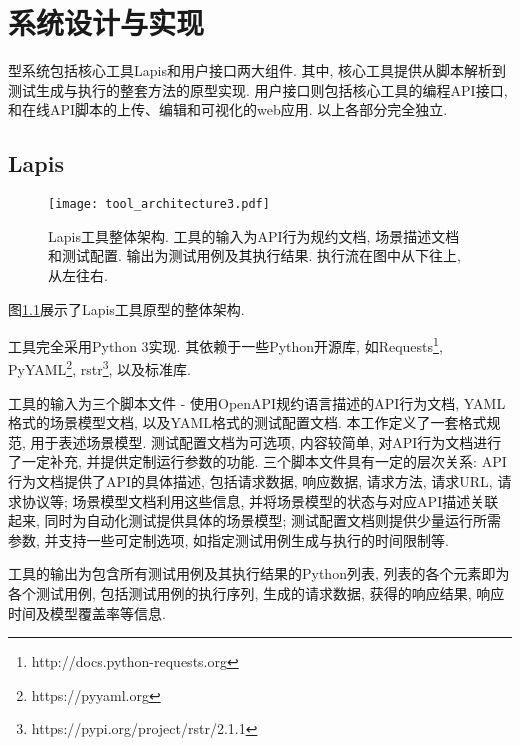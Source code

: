 \chapter{系统设计与实现}

    型系统包括核心工具Lapis和用户接口两大组件. 其中, 核心工具提供从脚本解析到测试生成与执行的整套方法的原型实现. 用户接口则包括核心工具的编程API接口, 和在线API脚本的上传、编辑和可视化的web应用. 以上各部分完全独立.


	\section{Lapis}
	
	    \begin{figure}[!htb]
	        \centering
	        \texttt{[image: tool\_architecture3.pdf]}
	        \caption{Lapis工具整体架构. 工具的输入为API行为规约文档, 场景描述文档和测试配置. 输出为测试用例及其执行结果. 执行流在图中从下往上, 从左往右.}
	        \label{fig:lapis_arch}
	    \end{figure}
	    
	    图\ref{fig:lapis_arch}展示了Lapis工具原型的整体架构.
	    
	    工具完全采用Python 3实现. 其依赖于一些Python开源库, 如Requests\footnote{http://docs.python-requests.org}, PyYAML\footnote{https://pyyaml.org}, rstr\footnote{https://pypi.org/project/rstr/2.1.1}, 以及标准库.
	    
	    工具的输入为三个脚本文件 - 使用OpenAPI规约语言描述的API行为文档, YAML格式的场景模型文档, 以及YAML格式的测试配置文档. 本工作定义了一套格式规范, 用于表述场景模型. 测试配置文档为可选项, 内容较简单, 对API行为文档进行了一定补充, 并提供定制运行参数的功能. 三个脚本文件具有一定的层次关系: API行为文档提供了API的具体描述, 包括请求数据, 响应数据, 请求方法, 请求URL, 请求协议等; 场景模型文档利用这些信息, 并将场景模型的状态与对应API描述关联起来, 同时为自动化测试提供具体的场景模型; 测试配置文档则提供少量运行所需参数, 并支持一些可定制选项, 如指定测试用例生成与执行的时间限制等.
	    
	    \label{sec:lapis_impl}
	    工具的输出为包含所有测试用例及其执行结果的Python列表, 列表的各个元素即为各个测试用例, 包括测试用例的执行序列, 生成的请求数据, 获得的响应结果, 响应时间及模型覆盖率等信息.

